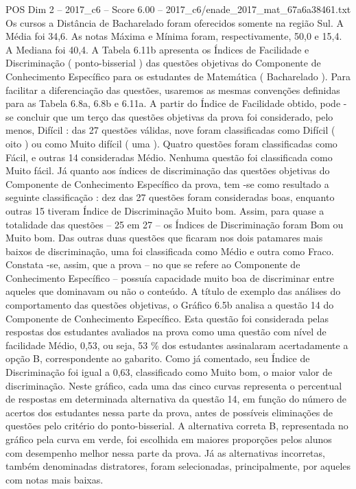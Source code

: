 \begin{textsample}{POS Dim 2 – 2017\_c6 – Score 6.00 – 2017\_c6/enade\_2017\_mat\_67a6a38461.txt}
Os cursos a Distância de Bacharelado foram oferecidos somente na região Sul.
A Média foi 34,6.
As notas Máxima e Mínima foram, respectivamente, 50,0 e 15,4.
A Mediana foi 40,4.
A Tabela 6.11b apresenta os Índices de Facilidade e Discriminação ( ponto-bisserial ) das questões objetivas do Componente de Conhecimento Específico para os estudantes de Matemática ( Bacharelado ).
Para facilitar a diferenciação das questões, usaremos as mesmas convenções definidas para as Tabela 6.8a, 6.8b e 6.11a.
A partir do Índice de Facilidade obtido, pode -se concluir que um terço das questões objetivas da prova foi considerado, pelo menos, Difícil : das 27 questões válidas, nove foram classificadas como Difícil ( oito ) ou como Muito difícil ( uma ).
Quatro questões foram classificadas como Fácil, e outras 14 consideradas Médio.
Nenhuma questão foi classificada como Muito fácil.
Já quanto aos índices de discriminação das questões objetivas do Componente de Conhecimento Específico da prova, tem -se como resultado a seguinte classificação : dez das 27 questões foram consideradas boas, enquanto outras 15 tiveram Índice de Discriminação Muito bom.
Assim, para quase a totalidade das questões – 25 em 27 – os Índices de Discriminação foram Bom ou Muito bom.
Das outras duas questões que ficaram nos dois patamares mais baixos de discriminação, uma foi classificada como Médio e outra como Fraco.
Constata -se, assim, que a prova – no que se refere ao Componente de Conhecimento Específico – possuía capacidade muito boa de discriminar entre aqueles que dominavam ou não o conteúdo.
A título de exemplo das análises do comportamento das questões objetivas, o Gráfico 6.5b analisa a questão 14 do Componente de Conhecimento Específico.
Esta questão foi considerada pelas respostas dos estudantes avaliados na prova como uma questão com nível de facilidade Médio, 0,53, ou seja, 53 \% dos estudantes assinalaram acertadamente a opção B, correspondente ao gabarito.
Como já comentado, seu Índice de Discriminação foi igual a 0,63, classificado como Muito bom, o maior valor de discriminação.
Neste gráfico, cada uma das cinco curvas representa o percentual de respostas em determinada alternativa da questão 14, em função do número de acertos dos estudantes nessa parte da prova, antes de possíveis eliminações de questões pelo critério do ponto-bisserial.
A alternativa correta B, representada no gráfico pela curva em verde, foi escolhida em maiores proporções pelos alunos com desempenho melhor nessa parte da prova.
Já as alternativas incorretas, também denominadas distratores, foram selecionadas, principalmente, por aqueles com notas mais baixas.

\end{textsample}
